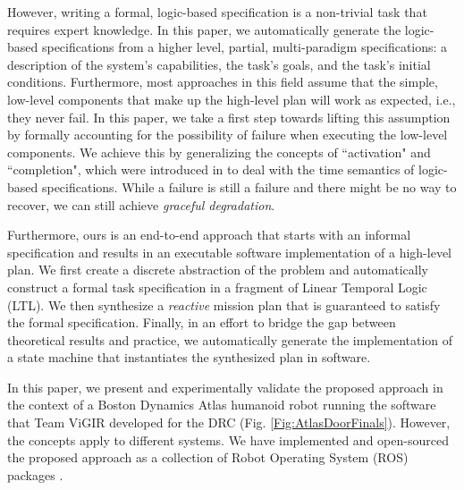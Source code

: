 However, writing a formal, logic-based specification is a non-trivial task that requires expert knowledge.
In this paper, we automatically generate the logic-based specifications from a higher level, partial, multi-paradigm specifications: a description of the system's capabilities, the task's goals, and the task's initial conditions.
Furthermore, most approaches in this field assume that the simple, low-level components that make up the high-level plan will work as expected, i.e., they never fail.
In this paper, we take a first step towards lifting this assumption by formally accounting for the possibility of failure when executing the low-level components.
We achieve this by generalizing the concepts of ``activation" and ``completion", which were introduced in \cite{Vasu2013ICRA} to deal with the time semantics of logic-based specifications.
While a failure is still a failure and there might be no way to recover, we can still achieve \emph{graceful degradation}.

Furthermore, ours is an end-to-end approach that starts with an informal specification and results in an executable software implementation of a high-level plan.
We first create a discrete abstraction of the problem and automatically construct a formal task specification in a fragment of Linear Temporal Logic (\textsc{LTL}).
We then synthesize a \emph{reactive} mission plan that is guaranteed to satisfy the formal specification.
Finally, in an effort to bridge the gap between theoretical results and practice, we automatically generate the implementation of a state machine that instantiates the synthesized plan in software.

In this paper, we present and experimentally validate the proposed approach in the context of a Boston Dynamics Atlas humanoid robot running the software that Team ViGIR developed for the DRC (Fig. \ref{Fig:AtlasDoorFinals}).
However, the concepts apply to different systems.
We have implemented and open-sourced the proposed approach as a collection of Robot Operating System (ROS) packages \cite{ROS2009ICRA, ROS}.

